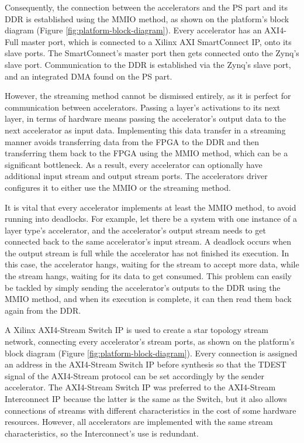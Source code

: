 Consequently, the connection between the accelerators and the PS part and its DDR is established using the MMIO method, as shown on the platform's block diagram (Figure \ref{fig:platform-block-diagram}). Every accelerator has an AXI4-Full \cite{UG1037-Vivado-Design-Suite-AXI-Reference-Guide} master port, which is connected to a Xilinx AXI SmartConnect IP, onto its slave ports. The SmartConnect's master port then gets connected onto the Zynq's slave port. Communication to the DDR is established via the Zynq's slave port, and an integrated DMA found on the PS part.

However, the streaming method cannot be dismissed entirely, as it is perfect for communication between accelerators. Passing a layer's activations to its next layer, in terms of hardware means passing the accelerator's output data to the next accelerator as input data. Implementing this data transfer in a streaming manner avoids transferring data from the FPGA to the DDR and then transferring them back to the FPGA using the MMIO method, which can be a significant bottleneck. As a result, every accelerator can optionally have additional input stream and output stream ports. The accelerators driver configures it to either use the MMIO or the streaming method.

It is vital that every accelerator implements at least the MMIO method, to avoid running into deadlocks. For example, let there be a system with one instance of a layer type's accelerator, and the accelerator's output stream needs to get connected back to the same accelerator's input stream. A deadlock occurs when the output stream is full while the accelerator has not finished its execution. In this case, the accelerator hangs, waiting for the stream to accept more data, while the stream hangs, waiting for its data to get consumed. This problem can easily be tackled by simply sending the accelerator's outputs to the DDR using the MMIO method, and when its execution is complete, it can then read them back again from the DDR.

A Xilinx AXI4-Stream Switch IP \cite{PG085-AXI4-Stream-Infrastructure-IP-Suite-Product-Guide} is used to create a star topology \cite{Network-Topology-Wikipedia} stream network, connecting every accelerator's stream ports, as shown on the platform's block diagram (Figure \ref{fig:platform-block-diagram}). Every connection is assigned an address in the AXI4-Stream Switch IP before synthesis so that the TDEST signal of the AXI4-Stream protocol can be set accordingly by the sender accelerator. The AXI4-Stream Switch IP was preferred to the AXI4-Stream Interconnect IP because the latter is the same as the Switch, but it also allows connections of streams with different characteristics in the cost of some hardware resources. However, all accelerators are implemented with the same stream characteristics, so the Interconnect's use is redundant.

